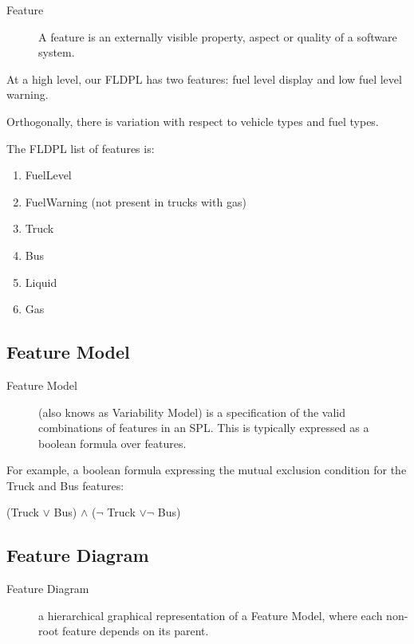 \documentclass[11pt]{article}
\begin{document}
\begin{description}

\item[Feature]
A feature is an externally visible property, aspect or quality of a software system.

\end{description}

At a high level, our FLDPL has two features: fuel level display and low fuel level warning.

Orthogonally, there is variation with respect to vehicle types and fuel types. 

The FLDPL list of features is:

\begin{enumerate}
\item FuelLevel
\item FuelWarning (not present in trucks with gas)
\item Truck
\item Bus
\item Liquid
\item Gas
\end{enumerate}

\subsection{Feature Model}

\begin{description}

\item[Feature Model]
(also knows as Variability Model) is a specification of the valid combinations of features in an SPL. This is typically expressed as a boolean formula over features.

\end{description}

For example, a boolean formula expressing the mutual exclusion condition for the Truck and Bus features:

(Truck $\vee$ Bus) $\wedge$ ($\neg$ Truck $\vee \neg$ Bus)

\subsection{Feature Diagram}

\begin{description}

\item[Feature Diagram]
a hierarchical graphical representation of a Feature Model, where each non-root feature depends on its parent.

\end{description}
\end{document}
